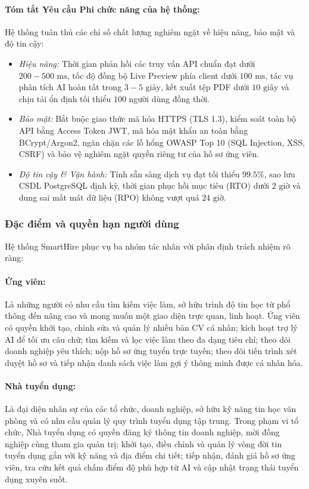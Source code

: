 \paragraph{Tóm tắt Yêu cầu Phi chức năng của hệ thống:}
Hệ thống tuân thủ các chỉ số chất lượng nghiêm ngặt về hiệu năng, bảo mật và độ tin cậy:
\begin{itemize}
    \item \textit{Hiệu năng:} Thời gian phản hồi các truy vấn API chuẩn đạt dưới $200-500\text{ ms}$, tốc độ đồng bộ Live Preview phía client dưới $100\text{ ms}$, tác vụ phân tích AI hoàn tất trong $3-5\text{ giây}$, kết xuất tệp PDF dưới $10\text{ giây}$ và chịu tải ổn định tối thiểu $100$ người dùng đồng thời.
    \item \textit{Bảo mật:} Bắt buộc giao thức mã hóa HTTPS (TLS 1.3), kiểm soát toàn bộ API bằng Access Token JWT, mã hóa mật khẩu an toàn bằng BCrypt/Argon2, ngăn chặn các lỗ hổng OWASP Top 10 (SQL Injection, XSS, CSRF) và bảo vệ nghiêm ngặt quyền riêng tư của hồ sơ ứng viên.
    \item \textit{Độ tin cậy \& Vận hành:} Tính sẵn sàng dịch vụ đạt tối thiểu $99.5\%$, sao lưu CSDL PostgreSQL định kỳ, thời gian phục hồi mục tiêu (RTO) dưới $2\text{ giờ}$ và dung sai mất mát dữ liệu (RPO) không vượt quá $24\text{ giờ}$.
\end{itemize}

\subsubsection{Đặc điểm và quyền hạn người dùng}
Hệ thống SmartHire phục vụ ba nhóm tác nhân với phân định trách nhiệm rõ ràng:

\paragraph{Ứng viên:}
Là những người có nhu cầu tìm kiếm việc làm, sở hữu trình độ tin học từ phổ thông đến nâng cao và mong muốn một giao diện trực quan, linh hoạt. Ứng viên có quyền khởi tạo, chỉnh sửa và quản lý nhiều bản CV cá nhân; kích hoạt trợ lý AI để tối ưu câu chữ; tìm kiếm và lọc việc làm theo đa dạng tiêu chí; theo dõi doanh nghiệp yêu thích; nộp hồ sơ ứng tuyển trực tuyến; theo dõi tiến trình xét duyệt hồ sơ và tiếp nhận danh sách việc làm gợi ý thông minh được cá nhân hóa.

\paragraph{Nhà tuyển dụng:}
Là đại diện nhân sự của các tổ chức, doanh nghiệp, sở hữu kỹ năng tin học văn phòng và có nhu cầu quản lý quy trình tuyển dụng tập trung. Trong phạm vi tổ chức, Nhà tuyển dụng có quyền đăng ký thông tin doanh nghiệp, mời đồng nghiệp cùng tham gia quản trị; khởi tạo, điều chỉnh và quản lý vòng đời tin tuyển dụng gắn với kỹ năng và địa điểm chi tiết; tiếp nhận, đánh giá hồ sơ ứng viên, tra cứu kết quả chấm điểm độ phù hợp từ AI và cập nhật trạng thái tuyển dụng xuyên suốt.

